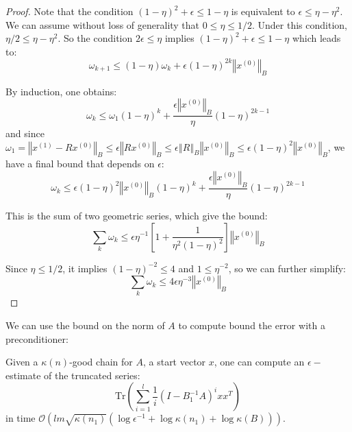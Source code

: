\begin{proof}
Note that the condition $\left(1-\eta\right)^{2}+\epsilon\leq1-\eta$
is equivalent to $\epsilon\leq\eta-\eta^{2}$. We can assume without
loss of generality that $0\leq\eta\leq1/2$. Under this condition,
$\eta/2\leq\eta-\eta^{2}$. So the condition $2\epsilon\leq\eta$
implies $\left(1-\eta\right)^{2}+\epsilon\leq1-\eta$ which leads
to: 
\[
\omega_{k+1}\leq\left(1-\eta\right)\omega_{k}+\epsilon\left(1-\eta\right)^{2k}\left\Vert x^{\left(0\right)}\right\Vert _{B}
\]


By induction, one obtains: 
\[
\omega_{k}\leq\omega_{1}\left(1-\eta\right)^{k}+\frac{\epsilon\left\Vert x^{\left(0\right)}\right\Vert _{B}}{\eta}\left(1-\eta\right)^{2k-1}
\]
and since $\omega_{1}=\left\Vert x^{\left(1\right)}-Rx^{\left(0\right)}\right\Vert _{B}\leq\epsilon\left\Vert Rx^{\left(0\right)}\right\Vert _{B}\leq\epsilon\left\Vert R\right\Vert _{B}\left\Vert x^{\left(0\right)}\right\Vert _{B}\leq\epsilon\left(1-\eta\right)^{2}\left\Vert x^{\left(0\right)}\right\Vert _{B}$,
we have a final bound that depends on $\epsilon$: 
\[
\omega_{k}\leq\epsilon\left(1-\eta\right)^{2}\left\Vert x^{\left(0\right)}\right\Vert _{B}\left(1-\eta\right)^{k}+\frac{\epsilon\left\Vert x^{\left(0\right)}\right\Vert _{B}}{\eta}\left(1-\eta\right)^{2k-1}
\]


This is the sum of two geometric series, which give the bound: 
\[
\sum_{k}\omega_{k}\leq\epsilon\eta^{-1}\left[1+\frac{1}{\eta^{2}\left(1-\eta\right)^{2}}\right]\left\Vert x^{\left(0\right)}\right\Vert _{B}
\]


Since $\eta\leq1/2$, it implies $\left(1-\eta\right)^{-2}\leq4$
and $1\leq\eta^{-2}$, so we can further simplify: 
\[
\sum_{k}\omega_{k}\leq4\epsilon\eta^{-3}\left\Vert x^{\left(0\right)}\right\Vert _{B}
\]


\end{proof}

We can use the bound on the norm of $A$ to compute bound the error
with a preconditioner:

\begin{proposition} \label{prop:estimate-truncated-series}Given
a $\kappa\left(n\right)$-good chain for $A$, a start vector $x$,
one can compute an $\epsilon-$estimate of the truncated series: 
\[
\mbox{Tr}\left(\sum_{i=1}^{l}\frac{1}{i}\left(I-B_{1}^{-1}A\right)^{i}xx^{T}\right)
\]
in time $\mathcal{O}\left(lm\sqrt{\kappa\left(n_{1}\right)}\left(\log\epsilon^{-1}+\log\kappa\left(n_{1}\right)+\log\kappa\left(B\right)\right)\right)$.\end{proposition} 

